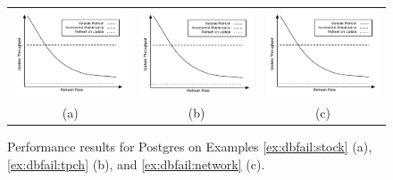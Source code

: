 \begin{figure}
\begin{center}
\begin{tabular}{ccc}
\includegraphics[width=2in]{../graphics-tmp/placeholder_db_result} &
\includegraphics[width=2in]{../graphics-tmp/placeholder_db_result} &
\includegraphics[width=2in]{../graphics-tmp/placeholder_db_result} \\
(a) & (b) & (c)
\end{tabular}
\end{center}
\label{fig:dbfail:postgres}
\caption{Performance results for Postgres on Examples \ref{ex:dbfail:stock} (a), \ref{ex:dbfail:tpch} (b), and \ref{ex:dbfail:network} (c).}
\end{figure}
